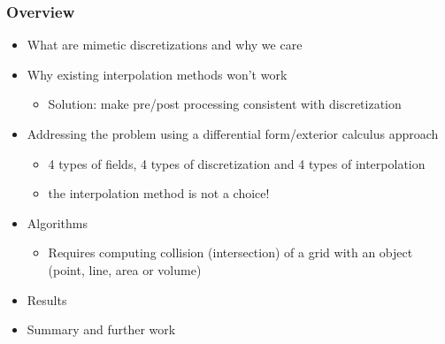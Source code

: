 \documentclass[aspectratio=169]{beamer}
\begin{document}
\begin{frame}[t]
  \frametitle{Overview}
    \begin{block}{}
      \begin{itemize}%
	  \item What are mimetic discretizations and why we care
      \item Why existing interpolation methods won't work
         \begin{itemize} \item Solution: make pre/post processing consistent with discretization \end{itemize}
      \item Addressing the problem using a differential form/exterior calculus approach
         \begin{itemize} \item 4 types of fields, 4 types of discretization and 4 types of interpolation 
                         \item the interpolation method is not a choice!
                         \end{itemize}
      \item Algorithms
         \begin{itemize} 
            \item Requires computing collision (intersection) of a grid with an object (point, line, area or volume)
         \end{itemize}
      \item Results
      \item Summary and further work
    \end{itemize}
  \end{block}
\end{frame}
\end{document}
